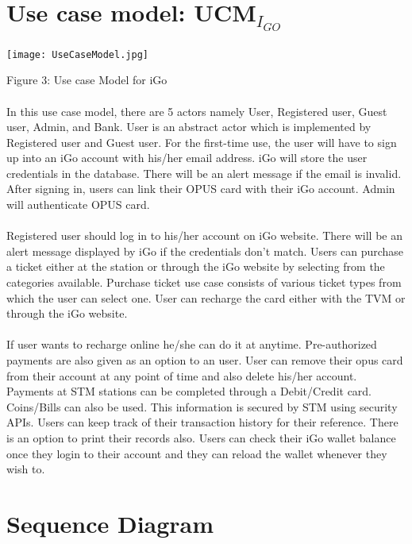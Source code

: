 \documentclass[a4paper, 11pt]{report}
\begin{document}
{\section{Use case model: UCM$_{I_{GO}}$}
 \texttt{[image: UseCaseModel.jpg]}

\tab\tab\qquad\qquad\qquad\qquad\qquad\qquad\qquad Figure 3: Use case Model for iGo\\\\
In this use case model, there are 5 actors namely User, Registered user, Guest user, Admin, and Bank. User is an abstract actor which is implemented by Registered user and Guest user. For the first-time use, the user will have to sign up into an iGo account with his/her email address. iGo will store the user credentials in the database. There will be an alert message if the email is invalid. After signing in, users can link their OPUS card with their iGo account. Admin will authenticate OPUS card.\\\\ Registered user should log in to his/her account on iGo website. There will be an alert message displayed by iGo if the credentials don’t match. Users can purchase a ticket either at the station or through the iGo website by selecting from the categories available. Purchase ticket use case consists of various ticket types from which the user can select one. User can recharge the card either with the TVM or through the iGo website. \\\\ If user wants to recharge online he/she can do it at anytime. Pre-authorized payments are also given as an option to an user. User can remove their opus card from their account at any point of time and also delete his/her account. Payments at STM stations can be completed through a Debit/Credit card. Coins/Bills can also be used. This information is secured by STM using security APIs. Users can keep track of their transaction history for their reference. There is an option to print their records also. Users can check their iGo wallet balance once they login to their account and they can reload the wallet whenever they wish to.


\section{Sequence Diagram}
}
\end{document}
